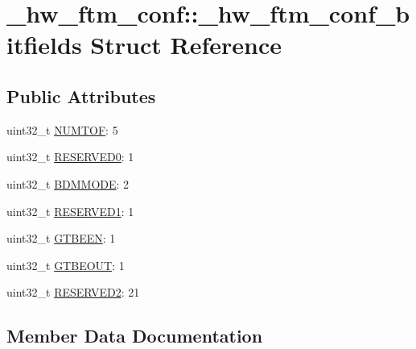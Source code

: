 \hypertarget{struct__hw__ftm__conf_1_1__hw__ftm__conf__bitfields}{}\section{\+\_\+hw\+\_\+ftm\+\_\+conf\+:\+:\+\_\+hw\+\_\+ftm\+\_\+conf\+\_\+bitfields Struct Reference}
\label{struct__hw__ftm__conf_1_1__hw__ftm__conf__bitfields}
\subsection*{Public Attributes}
\begin{DoxyCompactItemize}
\item 
uint32\+\_\+t \hyperlink{struct__hw__ftm__conf_1_1__hw__ftm__conf__bitfields_ac541c987c8185c6641b0d879689a5802}{N\+U\+M\+T\+OF}\+: 5
\item 
uint32\+\_\+t \hyperlink{struct__hw__ftm__conf_1_1__hw__ftm__conf__bitfields_a7c4f91ab519e951a9eb7c8c06c553c60}{R\+E\+S\+E\+R\+V\+E\+D0}\+: 1
\item 
uint32\+\_\+t \hyperlink{struct__hw__ftm__conf_1_1__hw__ftm__conf__bitfields_ae83e7ee4b9350fe804fa09e1fe7714fe}{B\+D\+M\+M\+O\+DE}\+: 2
\item 
uint32\+\_\+t \hyperlink{struct__hw__ftm__conf_1_1__hw__ftm__conf__bitfields_a517485c6570b3e1854410a978379f422}{R\+E\+S\+E\+R\+V\+E\+D1}\+: 1
\item 
uint32\+\_\+t \hyperlink{struct__hw__ftm__conf_1_1__hw__ftm__conf__bitfields_a90a156437f5ccbfea122807038f1385d}{G\+T\+B\+E\+EN}\+: 1
\item 
uint32\+\_\+t \hyperlink{struct__hw__ftm__conf_1_1__hw__ftm__conf__bitfields_a00839e9ad3ad84d1469f0f60e1c1ec9d}{G\+T\+B\+E\+O\+UT}\+: 1
\item 
uint32\+\_\+t \hyperlink{struct__hw__ftm__conf_1_1__hw__ftm__conf__bitfields_ae057e03cb895a25df19e95d8c13f9ed2}{R\+E\+S\+E\+R\+V\+E\+D2}\+: 21
\end{DoxyCompactItemize}


\subsection{Member Data Documentation}

